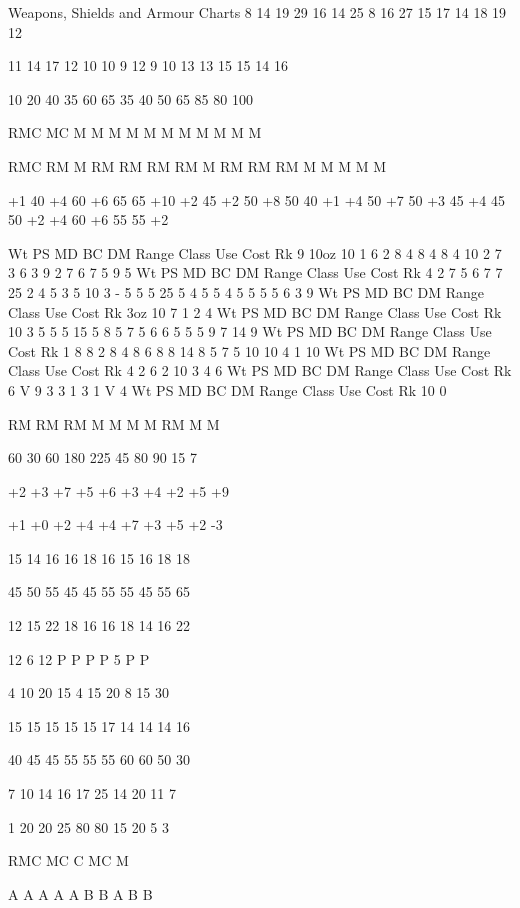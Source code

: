 \begin{Table}{Weapons, Shields and Armour Charts}
8 
14 
19 
29 
16 
14 
25 
8 
16 
27 
15 
17 
14 
18 
19 
12 

11 
14 
17 
12 
10 
10 
9 
12 
9 
10 
13 
13 
15 
15 
14 
16 

10 
20 
40 
35 
60 
65 
35 
40 
50 
65 
85 
80 
100 

RMC 
MC 
M 
M 
M 
M 
M 
M 
M 
M 
M 
M 
M 

RMC 
RM 
M 
RM 
RM 
RM 
RM 
M 
RM 
RM 
RM 
M 
M 
M 
M 
M 

+1 
40 
+4 
60 
+6 
65 
65  +10 
+2 
45 
+2 
50 
+8 
50 
40 
+1 
+4 
50 
+7 
50 
+3 
45 
+4 
45 
50 
+2 
+4 
60 
+6 
55 
55 
+2 

Wt  PS  MD  BC  DM  Range  Class  Use  Cost  Rk 
9 
10oz 
10 
1 
6 
2 
8 
4 
8 
4 
8 
4 
10 
2 
7 
3 
6 
3 
9 
2 
7 
6 
7 
5 
9 
5 
Wt  PS  MD  BC  DM  Range  Class  Use  Cost  Rk 
4 
2 
7 
5 
6 
7 
7 
25 
2 
4 
5 
3 
5 
10 
3 
- 
5 
5 
5 
25 
5 
4 
5 
5 
4 
5 
5 
5 
5 
6 
3 
9 
Wt  PS  MD  BC  DM  Range  Class  Use  Cost  Rk 
3oz 
10 
7 
1 
2 
4 
Wt  PS  MD  BC  DM  Range  Class  Use  Cost  Rk 
10 
3 
5 
5 
5 
15 
5 
8 
5 
7 
5 
6 
6 
5 
5 
5 
9 
7 
14 
9 
Wt  PS  MD  BC  DM  Range  Class  Use  Cost  Rk 
1 
8 
8 
2 
8 
4 
8 
6 
8 
8 
14 
8 
5 
7 
5 
10 
10 
4 
1 
10 
Wt  PS  MD  BC  DM  Range  Class  Use  Cost  Rk 
4 
2 
6 
2 
10 
3 
4 
6 
Wt  PS  MD  BC  DM  Range  Class  Use  Cost  Rk 
6 
V 
9 
3 
3 
1 
3 
1 
V 
4 
Wt  PS  MD  BC  DM  Range  Class  Use  Cost  Rk 
10 
0 

RM 
RM 
RM 
M 
M 
M 
M 
RM 
M 
M 

60 
30 
60 
180 
225 
45 
80 
90 
15 
7 

+2 
+3 
+7 
+5 
+6 
+3 
+4 
+2 
+5 
+9 

+1 
+0 
+2 
+4 
+4 
+7 
+3 
+5 
+2 
-3 

15 
14 
16 
16 
18 
16 
15 
16 
18 
18 

45 
50 
55 
45 
45 
55 
55 
45 
55 
65 

12 
15 
22 
18 
16 
16 
18 
14 
16 
22 

12 
6 
12 
P 
P 
P 
P 
5 
P 
P 

4 
10 
20 
15 
4 
15 
20 
8 
15 
30 

15 
15 
15 
15 
15 
17 
14 
14 
14 
16 

40 
45 
45 
55 
55 
55 
60 
60 
50 
30 

7 
10 
14 
16 
17 
25 
14 
20 
11 
7 

1 
20 
20 
25 
80 
80 
15 
20 
5 
3 

RMC 
MC 
C 
MC 
M 

A 
A 
A 
A 
A 
B 
B 
A 
B 
B 


\end{Table}
